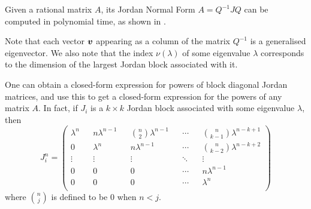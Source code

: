 Given a rational matrix $A$, its Jordan Normal Form $A=Q^{-1}JQ$ can be
computed in polynomial time, as shown in \cite{Cai94}.

Note that each vector $\boldsymbol{v}$ appearing as a column of the
matrix $Q^{-1}$ is a generalised eigenvector. We also note that the
index $\nu(\lambda)$ of some eigenvalue $\lambda$ corresponds to the
dimension of the largest Jordan block associated with it.

One can obtain a closed-form expression for powers of block diagonal
Jordan matrices, and use this to get a closed-form expression for
the powers of any matrix $A$. In fact, if $J_{i}$ is a
$k\times k$ Jordan block associated with some eigenvalue $\lambda$,
then
\begin{equation}
\label{eq:jordan_powers}
J_{i}^{n}=\begin{pmatrix}
\lambda^{n}	&&	n\lambda^{n-1}	&&	{n\choose 2}\lambda^{n-1}	&&
\cdots		&&	{n\choose k-1}\lambda^{n-k+1}				\\
0			&&	\lambda^{n}		&&	n\lambda^{n-1}				&&
\cdots		&&	{n\choose k-2}\lambda^{n-k+2}				\\
\vdots	&&	\vdots	&&	\vdots	&&	\ddots	&&	\vdots			\\
0		&&	0		&&	0		&&	\cdots	&&	n\lambda^{n-1}	\\
0		&&	0		&&	0		&&	\cdots	&&	\lambda^{n}		\\
\end{pmatrix}
\end{equation}
where ${n\choose j}$ is defined to be $0$ when $n<j$.
